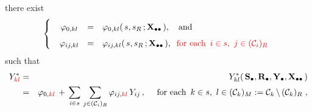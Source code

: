 \begin{itemize}
\begin{center}
\begin{minipage}{6.3in}
{    }
    \vskip 0.01cm
    \noindent
    there exist
    \begin{equation*}
    \left\{\;\;\begin{array}{ccl}
    \varphi_{0,kl}
    & \overset{{\color{white}\textnormal{\small$1$}}}{=} &
        \varphi_{0,kl}(\,s,s_{R}\,;\Xdotdot\,),
        \quad
        \textnormal{and}
    \\
    \varphi_{ij,kl}
    & \overset{{\color{white}\textnormal{\Large$1$}}}{=} &
        \varphi_{ij,kl}(\,s,s_{R}\,;\Xdotdot\,),
        \;\;
        \textnormal{{\color{red}for each \,$i \in s$,\, $j \in (\mathcal{C}_{i})_{R}$}}
    \end{array}\right.
    \end{equation*}
    such that
    \begin{eqnarray*}
    Y_{{\color{red}kl}}^{*}
    & = &
        Y^{*}_{kl}(\,\mathbf{S}_{\bullet},\mathbf{R}_{\bullet},\mathbf{Y}_{\bullet},\mathbf{X}_{\bullet\bullet}\,)
    \\
    & = &
        \varphi_{0,{\color{red}kl}}
        \, + \,
        \underset{i \in s}{\sum}\;
        \underset{j \in (\mathcal{C}_{i})_{R}}{\sum}\,
        \varphi_{ij,{\color{red}kl}}\,Y_{ij}\,,
        \quad
        \textnormal{
            for each
            \,$k \in s$,
            \,$l \in (\mathcal{C}_{k})_{M} := \mathcal{C}_{k} \,\backslash\, (\mathcal{C}_{k})_{R}$
            },
    \end{eqnarray*}
    \end{minipage}
    \end{center}
\end{itemize}
\vskip 0.1cm
